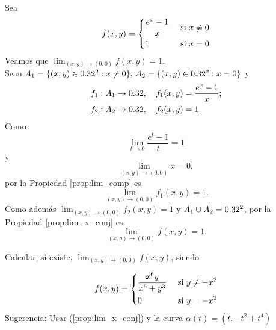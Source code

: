 \begin{example}   Sea 
  \[
   f(x,y) = 
     \begin{dcases}
        \dfrac{e^x - 1}{x}  & \text{ si } x \ne 0  \\
         1                 & \text{ si } x = 0
     \end{dcases}
  \]
 Veamos que $\lim_{(x,y) \to (0,0)} f(x,y) = 1$.\\
 Sean $A_1 = \{ (x,y) \in 0.32^2 : x \ne 0\}, \, A_2 = \{ (x,y) \in 0.32^2 : x = 0\}$ y 
 \begin{align*}
  f_1 &: A_1 \to 0.32,\quad f_1(x,y) = \frac{e^x - 1}{x}; \\
  f_2 &: A_2 \to 0.32,\quad f_2(x,y) = 1.
  \end{align*}
 Como 
 \[
    \lim_{t \to 0} \frac{e^t - 1}{t} = 1
 \]
 y 
 \[
    \lim_{(x,y) \to (0,0)} x = 0,
 \]
 por la Propiedad \ref{prop:lim_comp} es 
 \[
    \lim_{(x,y) \to (0,0)} f_1(x,y) = 1.
 \]
Como adem\'as $\lim_{(x,y) \to (0,0)} f_2(x,y) = 1$ y $A_1 \cup A_2 = 0.32^2$, por la Propiedad \ref{prop:lim_x_conj} es
 \[
  \lim_{(x,y) \to (0,0)} f(x,y) = 1.
 \]
\end{example}


\begin{tarea} Calcular, si existe,   $\lim_{(x,y) \to (0,0)} f(x,y)$, siendo  
  
 $$f(x,y) = 
     \begin{dcases}
        \dfrac{x^6 y}{x^6 + y^3}  & \text{ si }  y \ne -x^{2}  \\
         0               & \text{ si }   y  =  -x^{2}
     \end{dcases} $$
Sugerencia: Usar  (\ref{prop:lim_x_conj})  y la curva  $\alpha(t) = (t,-t^{2} + t^{4})$ 
\end{tarea}




